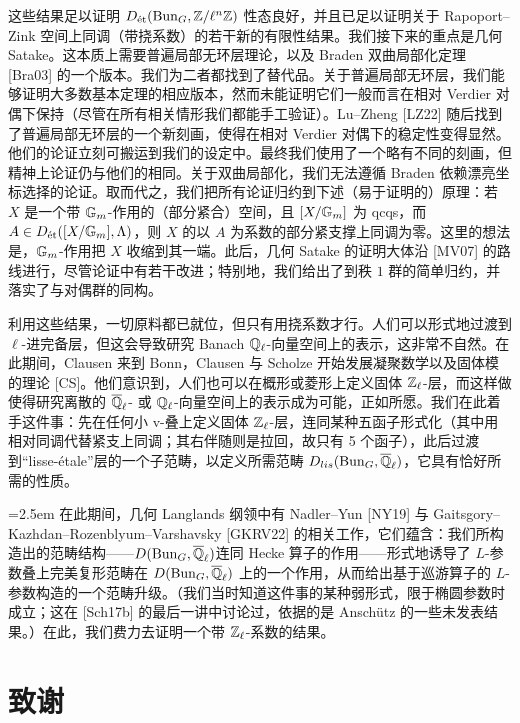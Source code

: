 这些结果足以证明 $D_{\text{ét}}(\mathrm{Bun}_G,\mathbb{Z}/\ell^n\mathbb{Z})$ 性态良好，并且已足以证明关于 Rapoport--Zink 空间上同调（带挠系数）的若干新的有限性结果。我们接下来的重点是几何 Satake。这本质上需要普遍局部无环层理论，以及 Braden 双曲局部化定理 [Bra03] 的一个版本。我们为二者都找到了替代品。关于普遍局部无环层，我们能够证明大多数基本定理的相应版本，然而未能证明它们一般而言在相对 Verdier 对偶下保持（尽管在所有相关情形我们都能手工验证）。Lu--Zheng [LZ22] 随后找到了普遍局部无环层的一个新刻画，使得在相对 Verdier 对偶下的稳定性变得显然。他们的论证立刻可搬运到我们的设定中。最终我们使用了一个略有不同的刻画，但精神上论证仍与他们的相同。关于双曲局部化，我们无法遵循 Braden 依赖漂亮坐标选择的论证。取而代之，我们把所有论证归约到下述（易于证明的）原理：若 $X$ 是一个带 $\mathbb{G}_m$-作用的（部分紧合）空间，且 $[X/\mathbb{G}_m]$ 为 qcqs，而 $A\in D_{\text{ét}}([X/\mathbb{G}_m],\Lambda)$，则 $X$ 的以 $A$ 为系数的部分紧支撑上同调为零。这里的想法是，$\mathbb{G}_m$-作用把 $X$ 收缩到其一端。此后，几何 Satake 的证明大体沿 [MV07] 的路线进行，尽管论证中有若干改进；特别地，我们给出了到秩 $1$ 群的简单归约，并落实了与对偶群的同构。

利用这些结果，一切原料都已就位，但只有用挠系数才行。人们可以形式地过渡到 $\ell$-进完备层，但这会导致研究 Banach $\mathbb{Q}_\ell$-向量空间上的表示，这非常不自然。在此期间，Clausen 来到 Bonn，Clausen 与 Scholze 开始发展凝聚数学以及固体模的理论 [CS]。他们意识到，人们也可以在概形或菱形上定义固体 $\mathbb{Z}_\ell$-层，而这样做使得研究离散的 $\overline{\mathbb{Q}}_\ell$- 或 $\mathbb{Q}_\ell$-向量空间上的表示成为可能，正如所愿。我们在此着手这件事：先在任何小 v-叠上定义固体 $\mathbb{Z}_\ell$-层，连同某种五函子形式化（其中用相对同调代替紧支上同调；其右伴随则是拉回，故只有 5 个函子），此后过渡到“lisse-\'etale”层的一个子范畴，以定义所需范畴 $D_{lis}(\mathrm{Bun}_G,\overline{\mathbb{Q}}_\ell)$，它具有恰好所需的性质。

\emergencystretch=2.5em
在此期间，几何 Langlands 纲领中有 Nadler--Yun [NY19] 与 Gaitsgory--Kazhdan--\allowbreak Rozenblyum--\allowbreak Varshavsky [GKRV22] 的相关工作，它们蕴含：我们所构造出的范畴结构——$D(\mathrm{Bun}_G,\overline{\mathbb{Q}}_\ell)$\allowbreak 连同 Hecke 算子的作用——\allowbreak 形式地诱导了 $L$-参数叠上完美复形范畴在 $D(\mathrm{Bun}_G,\overline{\mathbb{Q}}_\ell)$ 上的一个作用，从而给出基于巡游算子的 $L$-参数构造的一个范畴升级。（我们当时知道这件事的某种弱形式，限于椭圆参数时成立；这在 [Sch17b] 的最后一讲中讨论过，依据的是 Anschütz 的一些未发表结果。）在此，我们费力去证明一个带 $\mathbb{Z}_\ell$-系数的结果。

\emergencystretch=0pt

\section{致谢}

